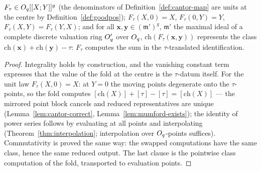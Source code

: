 \begin{lemma}
\label{lem:Ftau-basic}
\leanok
{}
$F_\tau \in O_q[[X;Y]]^g$ (the denominators of Definition~\ref{def:cantor-map} are
units at the centre by Definition~\ref{def:goodpos}); $F_\tau(X,0) = X$,
$F_\tau(0,Y) = Y$, $F_\tau(X,Y) = F_\tau(Y,X)$; and for all
$\mathbf x, \mathbf y \in (\mathfrak m')^g$, $\mathfrak m'$ the maximal ideal of a
complete discrete valuation ring $O_q'$ over $O_q$,
$\mathrm{ch}(F_\tau(\mathbf x,\mathbf y))$ represents the class
$\mathrm{ch}(\mathbf x) + \mathrm{ch}(\mathbf y) - \tau$: $F_\tau$ computes the sum in
the $\tau$-translated identification.
\end{lemma}
\begin{proof}
\leanok
Integrality holds by construction, and the vanishing constant term expresses that the
value of the fold at the centre is the $\tau$-datum itself. For the unit law
$F_\tau(X,0) = X$: at $Y = 0$ the moving points degenerate onto the $\tau$-points, so
the fold computes $[\mathrm{ch}(X)] + [\tau] - [\tau] = [\mathrm{ch}(X)]$ --- the
mirrored point block cancels and reduced representatives are unique
(Lemma~\ref{lem:cantor-correct}, Lemma~\ref{lem:mumford-exists}); the identity of
power series follows by evaluating at all points and interpolating
(Theorem~\ref{thm:interpolation}; interpolation over $O_q$-points suffices).
Commutativity is proved the same way: the swapped computations have the same class,
hence the same reduced output. The last clause is the pointwise class computation of
the fold, transported to evaluation points.
\end{proof}

